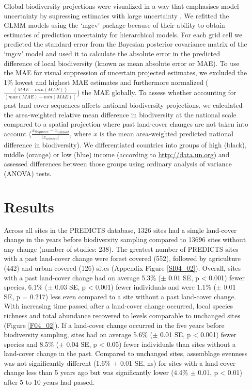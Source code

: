 Global biodiversity projections were visualized in a way that emphasises model uncertainty by supressing estimates with large uncertainty \citep{Correll2018}. We refitted the GLMM models using the ‘mgcv’ package \citep[ver. 1.8-24, ][]{Wood2011} because of their ability to obtain estimates of prediction uncertainty for hierarchical models. For each grid cell we predicted the standard error from the Bayesian posterior covariance matrix of the ‘mgcv’ model \citep{Wood2011} and used it to calculate the absolute error in the predicted difference of local biodiversity (known as mean absolute error or MAE). To use the MAE for visual suppression of uncertain projected estimates, we excluded the 1\% lowest and highest MAE estimates and furthermore normalized ($ \frac{(MAE - min(MAE) )}{(max(MAE) - min(MAE))} $) the MAE globally. To assess whether accounting for past land-cover sequences affects national biodiversity projections, we calculated the area-weighted relative mean difference in biodiversity at the national scale compared to a spatial projection where past land-cover changes are not taken into account ($\frac{x_{Sequence} -x_{without} }{|x_{without}|}$, where $x$ is the mean area-weighted predicted national difference in biodiversity). We differentiated countries into groups of high (black), middle (orange) or low (blue) income (according to \href{http://data.un.org}{http://data.un.org}) and assessed differences between those groups using ordinary analysis of variance (ANOVA) tests.

\section{Results}
\label{C04_03}

Across all sites in the PREDICTS database, 1326 sites had a single land-cover change in the years before biodiversity sampling compared to 13696 sites without any change (number of studies: 238). The greatest number of PREDICTS sites with a past land-cover change were forest covered (552), followed by agriculture (442) and urban covered (126) sites (Appendix Figure \ref{SI04_02}). Overall, sites with a past land-cover change had on average 5.3\% ($\pm$ 0.01 SE, p < 0.001) fewer species, 6.1\% ($\pm$ 0.03 SE, p < 0.001) fewer individuals and were 1.1\% ($\pm$ 0.01 SE, p = 0.217) less even compared to a site without a past land-cover change. With increasing time passed after a land-cover change occurred, local species richness and total abundance recovered to levels comparable to unchanged sites (Figure \ref{F04_02}). If a land-cover change occurred in the five years before biodiversity sampling, sites had on average 5.6\% ($\pm$ 0.01 SE, p < 0.001) fewer species and 8.5\% ($\pm$ 0.04 SE, p < 0.05) fewer individuals than sites without a land-cover change in the past. Compared to unchanged sites, assemblage evenness was not significantly different (1.6\% $\pm$ 0.01 SE, ns) for sites with a land-cover change less than 5 years ago but was significantly lower (4.4\% $\pm$ 0.01, p < 0.01) after 5 to 10 years had passed. 

